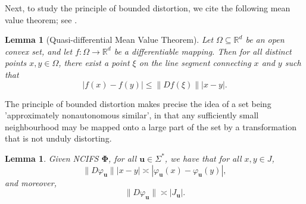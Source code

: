 \documentclass[12pt]{amsart}
\theoremstyle{plain}
\newtheorem{lem}[thm]{Lemma}
\theoremstyle{definition}
\theoremstyle{remark}
\begin{document}
Next, to study the   principle of bounded distortion, we cite the following mean value theorem;  see \cite{Rud76}. 
\begin{lem}[Quasi-differential Mean Value Theorem]\label{quasi_diff_mvt}
Let $\Omega \subseteq \mathbb{R}^d$ be an open convex set, and let $f: \Omega \to \mathbb{R}^d$ be a differentiable mapping. Then for all distinct points $x, y \in \Omega$, there exist a point $\xi$ on the line segment connecting $x$ and $y$ such that
$$
|f(x) - f(y)|\le \|Df(\xi)\||x - y|.
$$
\end{lem}
The principle of bounded distortion makes precise the idea of a set being 
'approximately nonautonomous similar', in that any sufficiently small neighbourhood may 
be mapped onto a large part of the set by a transformation that is not unduly 
distorting. 

\begin{lem}\label{contraction}
Given NCIFS $\boldsymbol{\Phi}$, for all $\mathbf{u}\in\Sigma^*$,  we have that for all $x, y\in J$,
\begin{equation}\label{ineq_BDxyL}
\|D\varphi_\mathbf{u}\||x-y|\asymp|\varphi_\mathbf{u}(x)-\varphi_\mathbf{u}(y)|, 
\end{equation}
and moreover,
\begin{equation}
\|D\varphi_\mathbf{u}\|\asymp|J_\mathbf{u}|. 
\end{equation}
\end{lem}	
\end{document}
